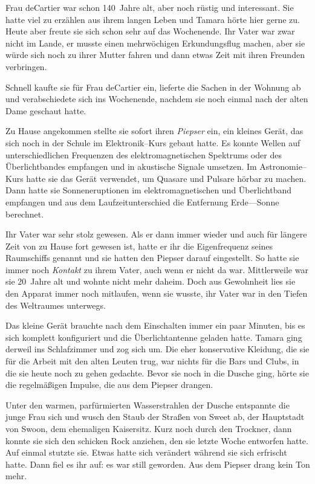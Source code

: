 \documentclass[11pt,twoside,openany]{scrbook}
\begin{document}
Frau deCartier war schon 140~Jahre alt, aber noch rüstig und interessant. Sie hatte viel zu erzählen aus ihrem langen Leben und Tamara hörte hier gerne zu. Heute aber freute sie sich schon sehr auf das Wochenende. Ihr Vater war zwar nicht im Lande, er musste einen mehrwöchigen Erkundungsflug machen, aber sie würde sich noch zu ihrer Mutter fahren und dann etwas Zeit mit ihren Freunden verbringen.

Schnell kaufte sie für Frau deCartier ein, lieferte die Sachen in der Wohnung ab und verabschiedete sich ins Wochenende, nachdem sie noch einmal nach der alten Dame geschaut hatte.

Zu Hause angekommen stellte sie sofort ihren \emph{Piepser} ein, ein kleines Gerät, das sich noch in der Schule im Elektronik--Kurs gebaut hatte. Es konnte Wellen auf unterschiedlichen Frequenzen des elektromagnetischen Spektrums oder des Überlichtbandes empfangen und in akustische Signale umsetzen. Im Astronomie--Kurs hatte sie das Gerät verwendet, um Quasare und Pulsare hörbar zu machen. Dann hatte sie Sonneneruptionen im elektromagnetischen und Überlichtband empfangen und aus dem Laufzeitunterschied die Entfernung Erde---Sonne berechnet.

Ihr Vater war sehr stolz gewesen. Als er dann immer wieder und auch für längere Zeit von zu Hause fort gewesen ist, hatte er ihr die Eigenfrequenz seines Raumschiffs genannt und sie hatten den Piepser darauf eingestellt. So hatte sie immer noch \emph{Kontakt} zu ihrem Vater, auch wenn er nicht da war. Mittlerweile war sie 20~Jahre alt und wohnte nicht mehr daheim. Doch aus Gewohnheit lies sie den Apparat immer noch mitlaufen, wenn sie wusste, ihr Vater war in den Tiefen des Weltraumes unterwegs.

Das kleine Gerät brauchte nach dem Einschalten immer ein paar Minuten, bis es sich komplett konfiguriert und die Überlichtantenne geladen hatte. Tamara ging derweil ins Schlafzimmer und zog sich um. Die eher konservative Kleidung, die sie für die Arbeit mit den alten Leuten trug, war nichts für die Bars und Clubs, in die sie heute noch zu gehen gedachte. Bevor sie noch in die Dusche ging, hörte sie die regelmäßigen Impulse, die aus dem Piepser drangen.

Unter den warmen, parfürmierten Wasserstrahlen der Dusche entspannte die junge Frau sich und wusch den Staub der Straßen von Sweet ab, der Hauptstadt von Swoon, dem ehemaligen Kaisersitz. Kurz noch durch den Trockner, dann konnte sie sich den schicken Rock anziehen, den sie letzte Woche entworfen hatte. Auf einmal stutzte sie. Etwas hatte sich verändert während sie sich erfrischt hatte. Dann fiel es ihr auf: es war still geworden. Aus dem Piepser drang kein Ton mehr.
\end{document}
